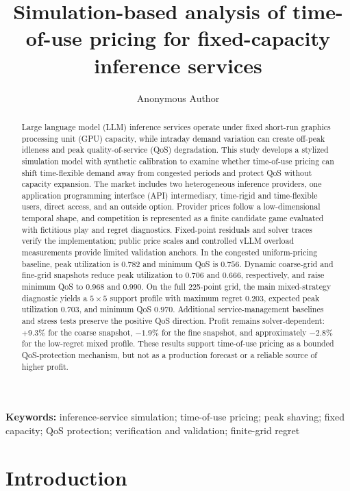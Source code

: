 \documentclass[11pt,a4paper]{article}
\title{\textbf{Simulation-based analysis of time-of-use pricing for fixed-capacity inference services}}
\author{Anonymous Author}
\date{}
\begin{document}
\maketitle

\begin{abstract}
Large language model (LLM) inference services operate under fixed short-run graphics processing unit (GPU) capacity, while intraday demand variation can create off-peak idleness and peak quality-of-service (QoS) degradation. This study develops a stylized simulation model with synthetic calibration to examine whether time-of-use pricing can shift time-flexible demand away from congested periods and protect QoS without capacity expansion. The market includes two heterogeneous inference providers, one application programming interface (API) intermediary, time-rigid and time-flexible users, direct access, and an outside option. Provider prices follow a low-dimensional temporal shape, and competition is represented as a finite candidate game evaluated with fictitious play and regret diagnostics. Fixed-point residuals and solver traces verify the implementation; public price scales and controlled vLLM overload measurements provide limited validation anchors. In the congested uniform-pricing baseline, peak utilization is $0.782$ and minimum QoS is $0.756$. Dynamic coarse-grid and fine-grid snapshots reduce peak utilization to $0.706$ and $0.666$, respectively, and raise minimum QoS to $0.968$ and $0.990$. On the full 225-point grid, the main mixed-strategy diagnostic yields a $5\times5$ support profile with maximum regret $0.203$, expected peak utilization $0.703$, and minimum QoS $0.970$. Additional service-management baselines and stress tests preserve the positive QoS direction. Profit remains solver-dependent: $+9.3\%$ for the coarse snapshot, $-1.9\%$ for the fine snapshot, and approximately $-2.8\%$ for the low-regret mixed profile. These results support time-of-use pricing as a bounded QoS-protection mechanism, but not as a production forecast or a reliable source of higher profit.
\end{abstract}

\noindent\textbf{Keywords:} inference-service simulation; time-of-use pricing; peak shaving; fixed capacity; QoS protection; verification and validation; finite-grid regret

\section{Introduction}
\label{sec:intro}
\end{document}
